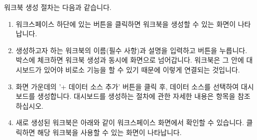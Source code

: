\documentclass[letterpaper,10pt,english]{sphinxmanual}
\begin{document}
워크북 생성 절차는 다음과 같습니다.
\begin{enumerate}
\def\theenumi{\arabic{enumi}}
\def\labelenumi{\theenumi .}
\makeatletter\def\p@enumii{\p@enumi \theenumi .}\makeatother
\item {} 
워크스페이스 하단에 있는  버튼을 클릭하면 워크북을 생성할 수 있는 화면이 나타납니다.
\begin{quote}

\begin{figure}[H]
\centering

\noindent{}
\end{figure}
\end{quote}

\item {} 
생성하고자 하는 워크북의 이름(필수 사항)과 설명을 입력하고  버튼을 누릅니다.  박스에 체크하면 워크북 생성과 동시에  화면으로 넘어갑니다. 워크북은 그 안에 대시보드가 있어야 비로소 기능을 할 수 있기 때문에 이렇게 연결되는 것입니다.
\begin{quote}

\begin{figure}[H]
\centering

\noindent{}
\end{figure}
\end{quote}

\item {} 
화면 가운데의 '+ 데이터 소스 추가' 버튼을 클릭 후, 데이터 소스를 선택하여 대시보드를 생성합니다. 대시보드를 생성하는 절차에 관한 자세한 내용은 {\hyperref[\detokenize{discovery/part04/create_a_dashboard::doc}]{}} 항목을 참조하십시오.
\begin{quote}

\begin{figure}[H]
\centering

\noindent{}
\end{figure}

\begin{figure}[H]
\centering

\noindent{}
\end{figure}
\end{quote}

\item {} 
새로 생성된 워크북은 아래와 같이 워크스페이스 화면에서 확인할 수 있습니다. 클릭하면 해당 워크북을 사용할 수 있는 화면이 나타납니다.
\begin{quote}

\begin{figure}[H]
\centering

\noindent{}
\end{figure}
\end{quote}

\end{enumerate}
\end{document}
